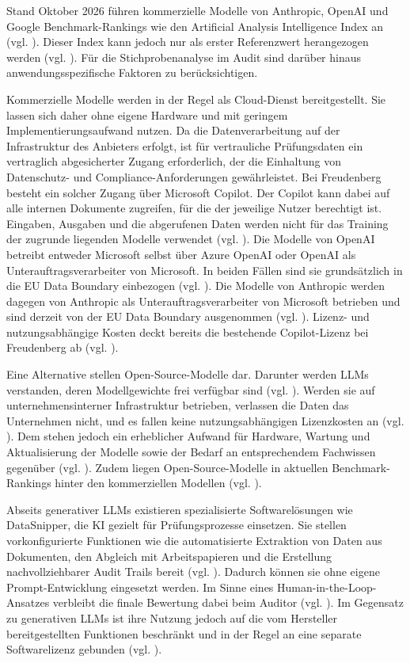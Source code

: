 Stand Oktober 2026 führen kommerzielle Modelle von Anthropic, OpenAI und Google Benchmark-Rankings wie den Artificial Analysis Intelligence Index an (vgl. \cite{ArtificialAnalysis2026}). Dieser Index kann jedoch nur als erster Referenzwert herangezogen werden (vgl. \cite{thebatch2026aaindex}). Für die Stichprobenanalyse im Audit sind darüber hinaus anwendungsspezifische Faktoren zu berücksichtigen.

Kommerzielle Modelle werden in der Regel als Cloud-Dienst bereitgestellt. Sie lassen sich daher ohne eigene Hardware und mit geringem Implementierungsaufwand nutzen. Da die Datenverarbeitung auf der Infrastruktur des Anbieters erfolgt, ist für vertrauliche Prüfungsdaten ein vertraglich abgesicherter Zugang erforderlich, der die Einhaltung von Datenschutz- und Compliance-Anforderungen gewährleistet. Bei Freudenberg besteht ein solcher Zugang über Microsoft Copilot. Der Copilot kann dabei auf alle internen Dokumente zugreifen, für die der jeweilige Nutzer berechtigt ist. Eingaben, Ausgaben und die abgerufenen Daten werden nicht für das Training der zugrunde liegenden Modelle verwendet (vgl. \cite{Microsoft2026Privacy}). Die Modelle von OpenAI betreibt entweder Microsoft selbst über Azure OpenAI oder OpenAI als Unterauftragsverarbeiter von Microsoft. In beiden Fällen sind sie grundsätzlich in die EU Data Boundary einbezogen (vgl. \cite{Microsoft2026Privacy, Microsoft2026OpenAI}). Die Modelle von Anthropic werden dagegen von Anthropic als Unterauftragsverarbeiter von Microsoft betrieben und sind derzeit von der EU Data Boundary ausgenommen (vgl. \cite{Microsoft2026Anthropic}). Lizenz- und nutzungsabhängige Kosten deckt bereits die bestehende Copilot-Lizenz bei Freudenberg ab (vgl. \cite{freudenberg2026copilot}).

Eine Alternative stellen Open-Source-Modelle dar. Darunter werden \acp{LLM} verstanden, deren Modellgewichte frei verfügbar sind (vgl. \cite[S.~2]{kapoor2024openfm}). Werden sie auf unternehmensinterner Infrastruktur betrieben, verlassen die Daten das Unternehmen nicht, und es fallen keine nutzungsabhängigen Lizenzkosten an (vgl. \cite[S.~3, 9]{kapoor2024openfm}). Dem stehen jedoch ein erheblicher Aufwand für Hardware, Wartung und Aktualisierung der Modelle sowie der Bedarf an entsprechendem Fachwissen gegenüber (vgl. \cite[S.~3]{kapoor2024openfm}). Zudem liegen Open-Source-Modelle in aktuellen Benchmark-Rankings hinter den kommerziellen Modellen (vgl. \cite{ArtificialAnalysis2026}).

Abseits generativer \acp{LLM} existieren spezialisierte Softwarelösungen wie DataSnipper, die \ac{KI} gezielt für Prüfungsprozesse einsetzen. Sie stellen vorkonfigurierte Funktionen wie die automatisierte Extraktion von Daten aus Dokumenten, den Abgleich mit Arbeitspapieren und die Erstellung nachvollziehbarer Audit Trails bereit (vgl. \cite{DataSnipperPricing2026}). Dadurch können sie ohne eigene Prompt-Entwicklung eingesetzt werden. Im Sinne eines Human-in-the-Loop-Ansatzes verbleibt die finale Bewertung dabei beim Auditor (vgl. \cite{DataSnipperAI2026}). Im Gegensatz zu generativen \acp{LLM} ist ihre Nutzung jedoch auf die vom Hersteller bereitgestellten Funktionen beschränkt und in der Regel an eine separate Softwarelizenz gebunden (vgl. \cite{DataSnipperPricing2026}).


